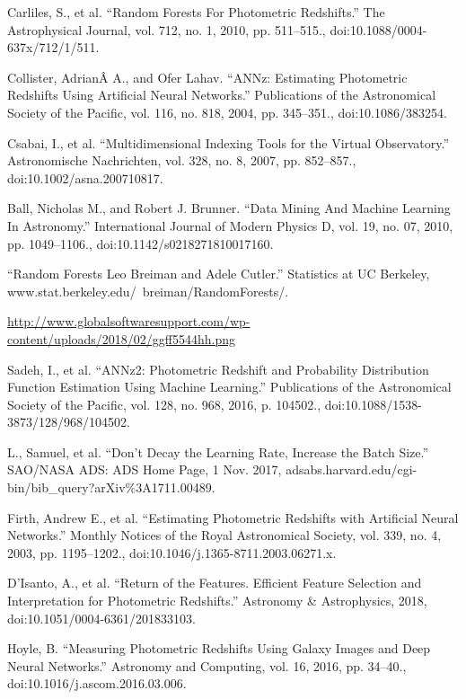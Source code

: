 \documentclass[12pt,letterpaper,oneside,openright]{book}
\begin{document}
\begin{thebibliography}{99\kern\bibindent}
Carliles, S., et al. “Random Forests For Photometric Redshifts.” The Astrophysical Journal, vol. 712, no. 1, 2010, pp. 511–515., doi:10.1088/0004-637x/712/1/511.

Collister, AdrianÂ A., and Ofer Lahav. “ANNz: Estimating Photometric Redshifts Using Artificial Neural Networks.” Publications of the Astronomical Society of the Pacific, vol. 116, no. 818, 2004, pp. 345–351., doi:10.1086/383254.

Csabai, I., et al. “Multidimensional Indexing Tools for the Virtual Observatory.” Astronomische Nachrichten, vol. 328, no. 8, 2007, pp. 852–857., doi:10.1002/asna.200710817.


Ball, Nicholas M., and Robert J. Brunner. “Data Mining And Machine Learning In Astronomy.” International Journal of Modern Physics D, vol. 19, no. 07, 2010, pp. 1049–1106., doi:10.1142/s0218271810017160.

“Random Forests Leo Breiman and Adele Cutler.” Statistics at UC Berkeley, www.stat.berkeley.edu/~breiman/RandomForests/.

\url{http://www.globalsoftwaresupport.com/wp-content/uploads/2018/02/ggff5544hh.png}

Sadeh, I., et al. “ANNz2: Photometric Redshift and Probability Distribution Function Estimation Using Machine Learning.” Publications of the Astronomical Society of the Pacific, vol. 128, no. 968, 2016, p. 104502., doi:10.1088/1538-3873/128/968/104502.

L., Samuel, et al. “Don't Decay the Learning Rate, Increase the Batch Size.” SAO/NASA ADS: ADS Home Page, 1 Nov. 2017, adsabs.harvard.edu/cgi-bin/bib\_{}query?arXiv\%{}3A1711.00489.

Firth, Andrew E., et al. “Estimating Photometric Redshifts with Artificial Neural Networks.” Monthly Notices of the Royal Astronomical Society, vol. 339, no. 4, 2003, pp. 1195–1202., doi:10.1046/j.1365-8711.2003.06271.x.

D'Isanto, A., et al. “Return of the Features. Efficient Feature Selection and Interpretation for Photometric Redshifts.” Astronomy \&{} Astrophysics, 2018, doi:10.1051/0004-6361/201833103.

Hoyle, B. “Measuring Photometric Redshifts Using Galaxy Images and Deep Neural Networks.” Astronomy and Computing, vol. 16, 2016, pp. 34–40., doi:10.1016/j.ascom.2016.03.006.


\end{thebibliography}
\end{document}
